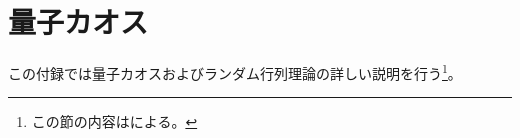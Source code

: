 \section{量子カオス \label{app:quantum_chaos}}

この付録では量子カオスおよびランダム行列理論の詳しい説明を行う\footnote{この節の内容は\cite{liu}による。}。

\pagebreak